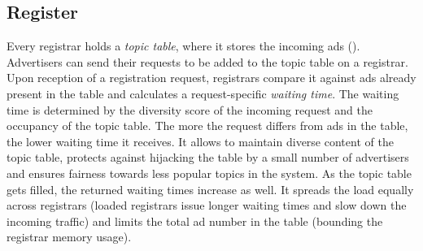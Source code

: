 





\iffalse
\subsection{Register}
Every registrar holds a \emph{topic table}, where it stores the incoming ads (). Advertisers can send their requests to be added to the topic table on a registrar. Upon reception of a registration request, registrars compare it against ads already present in the table and calculates a request-specific \emph{waiting time}. The waiting time is determined by the diversity score of the incoming request and the occupancy of the topic table.  The more the request differs from ads in the table, the lower waiting time it receives. It allows to maintain diverse content of the topic table, protects against hijacking the table by a small number of advertisers and ensures fairness towards less popular topics in the system. As the topic table gets filled, the returned waiting times increase as well. It spreads the load equally across registrars (loaded registrars issue longer waiting times and slow down the incoming traffic) and limits the total ad number in the table (bounding the registrar memory usage). 

